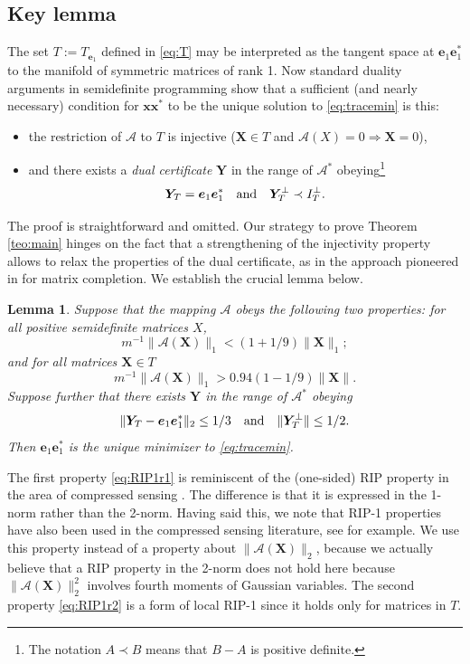 \documentclass[11pt]{article}
\newtheorem{lemma}[theorem]{Lemma}
\newcommand{\<}{\langle}
\renewcommand{\>}{\rangle}
\newcommand{\bx}{\bm{x}}
\newcommand{\bX}{\bm{X}}
\newcommand{\bY}{\bm{Y}}
\newcommand{\be}{\bm{e}}
\numberwithin{equation}{section}
\newcommand{\cA}{\mathcal{A}}
\begin{document}
\subsection{Key lemma}

The set $T := T_{\be_1}$ defined in \eqref{eq:T} may be interpreted as
the tangent space at $\be_1 \be_1^*$ to the manifold of symmetric
matrices of rank 1. Now standard duality arguments in semidefinite
programming show that a sufficient (and nearly necessary) condition
for $\bx\bx^*$ to be the unique solution to \eqref{eq:tracemin} is
this:
\begin{itemize}
\item the restriction of $\cA$ to $T$ is injective ($\bX \in T$ and
  $\cA(X) = 0 \Rightarrow \bX = 0$),
\item and there exists a {\em dual certificate} $\bY$ in the range of
  $\cA^*$ obeying\footnote{The notation $A \prec B$ means that $B - A$
    is positive definite.}
\begin{equation}
  \label{eq:dual}
  \bY_T = \be_1 \be_1^* \quad \text{and} \quad \bY_\Tp \prec I_\Tp. 
\end{equation}
\end{itemize}
The proof is straightforward and omitted.  Our strategy to prove
Theorem \ref{teo:main} hinges on the fact that a strengthening of the
injectivity property allows to relax the properties of the dual
certificate, as in the approach pioneered in \cite{Gross09} for matrix
completion. We establish the crucial lemma below.
\begin{lemma}
  \label{lem:crucial}
  Suppose that the mapping $\cA$ obeys the following two properties:
  for all positive semidefinite matrices $X$,
\begin{equation}
\label{eq:RIP1r1}
m^{-1} \|\cA(\bX)\|_1 < (1+1/9) \|\bX\|_1;
\end{equation}
and for all matrices $\bX \in T$
\begin{equation}
\label{eq:RIP1r2}
m^{-1} \|\cA(\bX)\|_1 > 0.94(1-1/9) \|\bX\|. 
\end{equation}
Suppose further that there exists $\bY$ in the range of $\cA^*$ obeying
\begin{equation}
  \label{eq:dualcertif}
  \|\bY_T - \be_1 \be_1^*\|_2 \le 1/3 \quad \text{and} \quad \|\bY_\Tp\| \le 1/2.
\end{equation}
Then $\be_1 \be_1^*$ is the unique minimizer to \eqref{eq:tracemin}.
\end{lemma}

The first property \eqref{eq:RIP1r1} is reminiscent of the (one-sided)
RIP property in the area of compressed sensing \cite{CT05}. The
difference is that it is expressed in the 1-norm rather than the
2-norm. Having said this, we note that RIP-1 properties have also been
used in the compressed sensing literature, see \cite{IndykGilbert} for
example. We use this property instead of a property about
$\|\cA(\bX)\|_2$, because we actually believe that a RIP property in
the 2-norm does not hold here because $\|\cA(\bX)\|_2^2$ involves fourth
moments of Gaussian variables. The second property \eqref{eq:RIP1r2}
is a form of local RIP-1 since it holds only for matrices in $T$.
\end{document}
